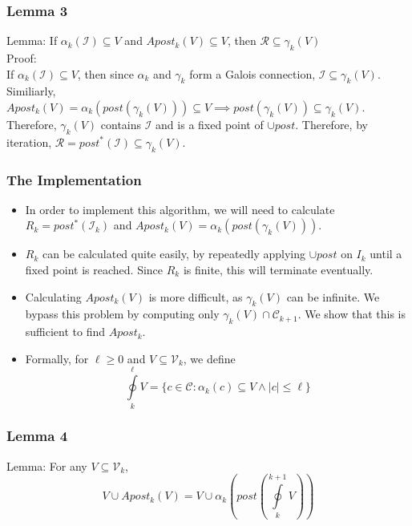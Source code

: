 \documentclass{beamer}
\begin{document}
{        \begin{frame}
            \frametitle{Lemma 3}
            Lemma: If $\alpha_{k}(\mathcal{I}) \subseteq V$ and $Apost_{k}(V) \subseteq V$, then $\mathcal{R} \subseteq \gamma_{k}(V)$\\
            Proof:\\
            If $\alpha_{k}(\mathcal{I}) \subseteq V$, then since $\alpha_{k}$ and $\gamma_{k}$ form a Galois connection, $\mathcal{I} \subseteq \gamma_{k}(V)$.
            Similiarly, $Apost_{k}(V) = \alpha_{k}(post(\gamma_{k}(V))) \subseteq V \implies post(\gamma_{k}(V)) \subseteq \gamma_{k}(V)$. Therefore, $\gamma_{k}(V)$ contains $\mathcal{I}$ 
            and is a fixed point of $\cup post$. Therefore, by iteration, $\mathcal{R} = post^{*}(\mathcal{I}) \subseteq \gamma_{k}(V)$.
        \end{frame}

        \begin{frame}
            \frametitle{The Implementation}
            \begin{itemize}
                \item In order to implement this algorithm, we will need to calculate $R_{k} = post^{*}(\mathcal{I}_{k})$ and $Apost_{k}(V) = \alpha_{k}(post(\gamma_{k}(V)))$.
                \item $R_{k}$ can be calculated quite easily, by repeatedly applying $\cup post$ on $I_{k}$ until a fixed point is reached. Since $R_{k}$ is finite, this will terminate eventually.
                \item Calculating $Apost_{k}(V)$ is more difficult, as $\gamma_{k}(V)$ can be infinite. We bypass this problem by computing only $\gamma_{k}(V) \cap \mathcal{C}_{k + 1}$. We show that this is sufficient 
                to find $Apost_{k}$.
                \item Formally, for $\ell \geq 0$ and $V \subseteq \mathcal{V}_{k}$, we define 
                \begin{equation*}
                    \oint\limits_{k}^{\ell} V = \{c \in \mathcal{C} : \alpha_{k}(c) \subseteq V \wedge \left|c\right| \leq \ell\}
                \end{equation*}
            \end{itemize}
        \end{frame}

        \begin{frame}
            \frametitle{Lemma 4}
            Lemma: For any $V \subseteq \mathcal{V}_{k}$,
            \begin{equation*}
                V \cup Apost_{k}(V) = V \cup \alpha_{k}(post(\oint\limits_{k}^{k + 1}V))
            \end{equation*}
        \end{frame}

}
\end{document}
